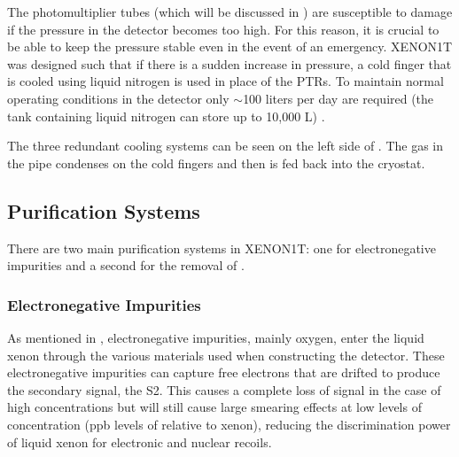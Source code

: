  The photomultiplier tubes (which will be discussed in ) are susceptible to damage if the pressure in the detector becomes too high.  For this reason, it is crucial to be able to keep the pressure stable even in the event of an emergency.  XENON1T was designed such that if there is a sudden increase in pressure, a cold finger that is cooled using liquid nitrogen is used in place of the PTRs.  To maintain normal operating conditions in the detector only $\sim$100 liters per day are required (the tank containing liquid nitrogen can store up to 10,000 L) \cite{aprile2017xenon1t}.
 
 The three redundant cooling systems can be seen on the left side of .  The gas in the pipe condenses on the cold fingers and then is fed back into the cryostat.

 
 \subsection{Purification Systems}
 \label{sec:xe1t_pur}
 
 There are two main purification systems in XENON1T: one for electronegative impurities and a second for the removal of .  
 
 \subsubsection{Electronegative Impurities}
 \label{sec:xe1t_pur_electronegative}
 
 As mentioned in , electronegative impurities, mainly oxygen, enter the liquid xenon through the various materials used when constructing the detector.  These electronegative impurities can capture free electrons that are drifted to produce the secondary signal, the S2.  This causes a complete loss of signal in the case of high concentrations but will still cause large smearing effects at low levels of concentration (ppb levels of  relative to xenon), reducing the discrimination power of liquid xenon for electronic and nuclear recoils.
 
